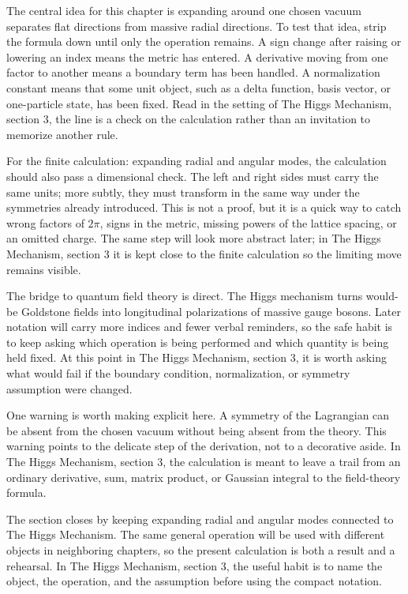 The central idea for this chapter is expanding around one chosen vacuum separates flat directions from massive radial directions.  To test that idea, strip the formula down until only the operation remains.  A sign change after raising or lowering an index means the metric has entered.  A derivative moving from one factor to another means a boundary term has been handled.  A normalization constant means that some unit object, such as a delta function, basis vector, or one-particle state, has been fixed.  Read in the setting of The Higgs Mechanism, section 3, the line is a check on the calculation rather than an invitation to memorize another rule.

For the finite calculation: expanding radial and angular modes, the calculation should also pass a dimensional check.  The left and right sides must carry the same units; more subtly, they must transform in the same way under the symmetries already introduced.  This is not a proof, but it is a quick way to catch wrong factors of \(2\pi\), signs in the metric, missing powers of the lattice spacing, or an omitted charge.  The same step will look more abstract later; in The Higgs Mechanism, section 3 it is kept close to the finite calculation so the limiting move remains visible.

The bridge to quantum field theory is direct.  The Higgs mechanism turns would-be Goldstone fields into longitudinal polarizations of massive gauge bosons.  Later notation will carry more indices and fewer verbal reminders, so the safe habit is to keep asking which operation is being performed and which quantity is being held fixed.  At this point in The Higgs Mechanism, section 3, it is worth asking what would fail if the boundary condition, normalization, or symmetry assumption were changed.

One warning is worth making explicit here.  A symmetry of the Lagrangian can be absent from the chosen vacuum without being absent from the theory.  This warning points to the delicate step of the derivation, not to a decorative aside.  In The Higgs Mechanism, section 3, the calculation is meant to leave a trail from an ordinary derivative, sum, matrix product, or Gaussian integral to the field-theory formula.

The section closes by keeping expanding radial and angular modes connected to The Higgs Mechanism.  The same general operation will be used with different objects in neighboring chapters, so the present calculation is both a result and a rehearsal.  In The Higgs Mechanism, section 3, the useful habit is to name the object, the operation, and the assumption before using the compact notation.



